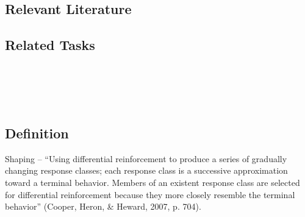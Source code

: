 \subsection{Relevant Literature}
\begin{refsection}
\nocite{cooper2007applied,
        vollmer1994concept}
\printbibliography[heading=none]
\end{refsection} 
%
\subsection{Related Tasks}
\fourFKSeventeen{}\\
\fourFKNineteen{}\\
\fourFKTwentyTwo{}\\
%
\clearpage \section{\fourdFive{}}
\subsection{Definition}
Shaping – ``Using differential reinforcement to produce a series of gradually changing response classes; each response class is a successive approximation toward a terminal behavior.  Members of an existent response class are selected for differential reinforcement because they more closely resemble the terminal behavior'' (Cooper, Heron, \& Heward, 2007, p. 704).
% 
